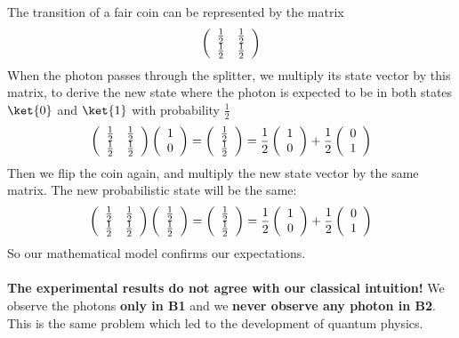 \documentclass[10pt]{report}
\begin{document}
The transition of a fair coin can be represented by the matrix $$\left(\begin{array}{c c}
\frac{1}{2}&\frac{1}{2}\\\frac{1}{2}&\frac{1}{2}
\end{array}\right)$$
When the photon passes through the splitter, we multiply its state vector by this matrix, to derive the new state where the photon is expected to be in both states $\ket{0}$ and $\ket{1}$ with probability $\frac{1}{2}$
$$\left(\begin{array}{c c}
\frac{1}{2}&\frac{1}{2}\\\frac{1}{2}&\frac{1}{2}
\end{array}\right)\left(\begin{array}{c}
1\\0
\end{array}\right) = \left(\begin{array}{c}
\frac{1}{2}\\\frac{1}{2}
\end{array}\right) = \frac{1}{2}\left(\begin{array}{c}
1\\0
\end{array}\right) + \frac{1}{2}\left(\begin{array}{c}
0\\1
\end{array}\right)$$
Then we flip the coin again, and multiply the new state vector by the same matrix. The new probabilistic state will be the same:
$$\left(\begin{array}{c c}
\frac{1}{2}&\frac{1}{2}\\\frac{1}{2}&\frac{1}{2}
\end{array}\right)\left(\begin{array}{c}
\frac{1}{2}\\\frac{1}{2}
\end{array}\right) = \left(\begin{array}{c}
\frac{1}{2}\\\frac{1}{2}
\end{array}\right) = \frac{1}{2}\left(\begin{array}{c}
1\\0
\end{array}\right) + \frac{1}{2}\left(\begin{array}{c}
0\\1
\end{array}\right)$$
So our mathematical model confirms our expectations.\\\\
\textbf{The experimental results do not agree with our classical intuition!} We observe the photons \textbf{only in B1} and we \textbf{never observe any photon in B2}. This is the same problem which led to the development of quantum physics.
\end{document}
